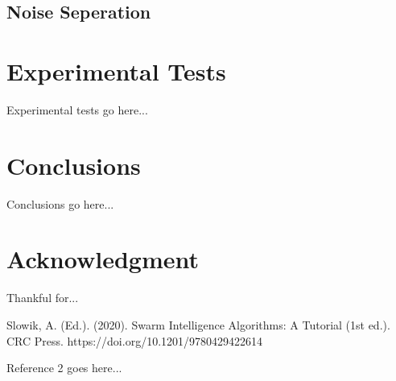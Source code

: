 \documentclass[conference]{IEEEtran}
\begin{document}
    \subsection{Noise Seperation}
    

\section{Experimental Tests}
Experimental tests go here...

\section{Conclusions}
Conclusions go here...

\section*{Acknowledgment}
Thankful for...

\begin{thebibliography}{1}
    
    
    Slowik, A. (Ed.). (2020). Swarm Intelligence Algorithms: A Tutorial (1st ed.). CRC Press. https://doi.org/10.1201/9780429422614
    
    Reference 2 goes here...
    
\end{thebibliography}
\end{document}
